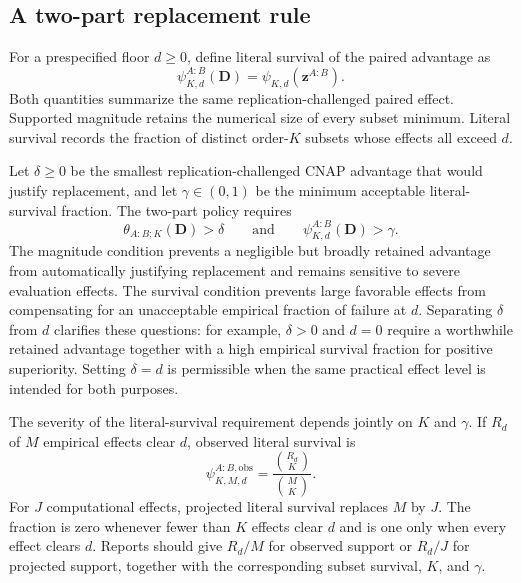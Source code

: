 \documentclass[11pt]{article}
\theoremstyle{remark}
\begin{document}
\subsection{A two-part replacement rule}

For a prespecified floor $d\geq0$, define literal survival of the paired advantage as
\begin{equation}
\psi^{A:B}_{K,d}(\mathbf D)
=
\psi_{K,d}\!\left(\mathbf z^{A:B}\right).
\label{eq:paired-literal-survival}
\end{equation}
Both quantities summarize the same replication-challenged paired effect.
Supported magnitude retains the numerical size of every subset minimum.
Literal survival records the fraction of distinct order-$K$ subsets whose
effects all exceed $d$.

Let $\delta\geq0$ be the smallest replication-challenged CNAP advantage that would justify replacement, and let $\gamma\in(0,1)$ be the minimum acceptable literal-survival fraction. The two-part policy requires
\begin{equation}
\theta_{A:B;K}(\mathbf D)>\delta
\qquad\text{and}\qquad
\psi^{A:B}_{K,d}(\mathbf D)>\gamma.
\label{eq:replacement-targets}
\end{equation}
The magnitude condition prevents a negligible but broadly retained advantage from automatically justifying replacement and remains sensitive to severe evaluation effects. The survival condition prevents large favorable effects from compensating for an unacceptable empirical fraction of failure at $d$. Separating $\delta$ from $d$ clarifies these questions: for example, $\delta>0$ and $d=0$ require a worthwhile retained advantage together with a high empirical survival fraction for positive superiority. Setting $\delta=d$ is permissible when the same practical effect level is intended for both purposes.

The severity of the literal-survival requirement depends jointly on $K$ and $\gamma$. If $R_d$ of $M$ empirical effects clear $d$, observed literal survival is
\begin{equation}
\psi_{K,M,d}^{A:B,\mathrm{obs}}
=
\frac{\binom{R_d}{K}}{\binom{M}{K}}.
\label{eq:empirical-survival-fraction}
\end{equation}
For $J$ computational effects, projected literal survival replaces $M$ by
$J$. The fraction is zero whenever fewer than $K$ effects clear $d$ and is one
only when every effect clears $d$. Reports should give $R_d/M$ for observed
support or $R_d/J$ for projected support, together with the corresponding
subset survival, $K$, and $\gamma$.
\end{document}
